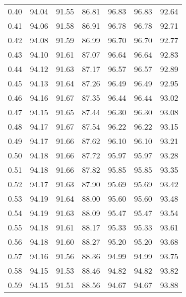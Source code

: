 \begin{tabular}{|c|c|c|c|c|c|c|}
      0.40 &     94.04 &     91.55 &      86.81 &   96.83 &      96.83 &         92.64 \\
      0.41 &     94.06 &     91.58 &      86.91 &   96.78 &      96.78 &         92.71 \\
      0.42 &     94.08 &     91.59 &      86.99 &   96.70 &      96.70 &         92.77 \\
      0.43 &     94.10 &     91.61 &      87.07 &   96.64 &      96.64 &         92.83 \\
      0.44 &     94.12 &     91.63 &      87.17 &   96.57 &      96.57 &         92.89 \\
      0.45 &     94.13 &     91.64 &      87.26 &   96.49 &      96.49 &         92.95 \\
      0.46 &     94.16 &     91.67 &      87.35 &   96.44 &      96.44 &         93.02 \\
      0.47 &     94.15 &     91.65 &      87.44 &   96.30 &      96.30 &         93.08 \\
      0.48 &     94.17 &     91.67 &      87.54 &   96.22 &      96.22 &         93.15 \\
      0.49 &     94.17 &     91.66 &      87.62 &   96.10 &      96.10 &         93.21 \\
      0.50 &     94.18 &     91.66 &      87.72 &   95.97 &      95.97 &         93.28 \\
      0.51 &     94.18 &     91.66 &      87.82 &   95.85 &      95.85 &         93.35 \\
      0.52 &     94.17 &     91.63 &      87.90 &   95.69 &      95.69 &         93.42 \\
      0.53 &     94.19 &     91.64 &      88.00 &   95.60 &      95.60 &         93.48 \\
      0.54 &     94.19 &     91.63 &      88.09 &   95.47 &      95.47 &         93.54 \\
      0.55 &     94.18 &     91.61 &      88.17 &   95.33 &      95.33 &         93.61 \\
      0.56 &     94.18 &     91.60 &      88.27 &   95.20 &      95.20 &         93.68 \\
      0.57 &     94.16 &     91.56 &      88.36 &   94.99 &      94.99 &         93.75 \\
      0.58 &     94.15 &     91.53 &      88.46 &   94.82 &      94.82 &         93.82 \\
      0.59 &     94.15 &     91.51 &      88.56 &   94.67 &      94.67 &         93.88 \\

\end{tabular}
